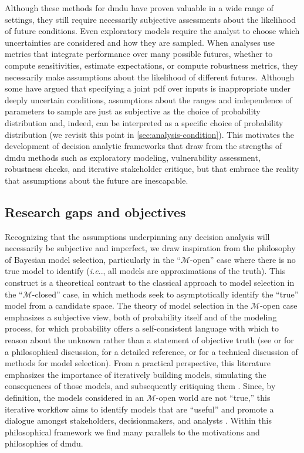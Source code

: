 \documentclass[11pt]{article}
\makeatletter
\newcommand{\klaus}[1]{\todo[color=rosso, textcolor=grigio]{\textbf{ATTN Klaus:~}#1}}
\DeclareRobustCommand\onedot{\futurelet\@let@token\@onedot}
\def\@onedot{\ifx\@let@token.\else.\null\fi\xspace}
\def\ie{\emph{i.e}\onedot} \def\Ie{\emph{I.e}\onedot}
\DeclareRobustCommand\onedot{\futurelet\@let@token\@onedot}
\def\@onedot{\ifx\@let@token.\else.\null\fi\xspace}
\def\ie{\emph{i.e}\onedot} \def\Ie{\emph{I.e}\onedot}
\makeatother
\begin{document}
Although these methods for \gls{dmdu} have proven valuable in a wide range of settings, they still require necessarily subjective assessments about the likelihood of future conditions.
Even exploratory models require the analyst to choose which uncertainties are considered and how they are sampled.
When analyses use metrics that integrate performance over many possible futures, whether to compute sensitivities, estimate expectations, or compute robustness metrics, they necessarily make assumptions about the likelihood of different futures.
Although some have argued\klaus{Can I get away w/o calling out a particular paper here?} that specifying a joint \gls{pdf} over inputs is inappropriate under deeply uncertain conditions, assumptions about the ranges and independence of parameters to sample are just as subjective as the choice of probability distribution \citep{schneider_scenarios:2002,quinn_exploratory:2020} and, indeed, can be interpreted  as a specific choice of probability distribution (we revisit this point in \cref{sec:analysis-condition}).
This motivates the development of decision analytic frameworks that draw from the strengths of \gls{dmdu} methods such as exploratory modeling, vulnerability assessment, robustness checks, and iterative stakeholder critique, but that embrace the reality that assumptions about the future are inescapable.

\subsection{Research gaps and objectives}

Recognizing that the assumptions underpinning any decision analysis will necessarily be subjective and imperfect, we draw inspiration from the philosophy of Bayesian model selection, particularly in the ``$\mathcal{M}$-open'' case where there is no true model to identify (\ie, all models are approximations of the truth).
This construct is a theoretical contrast to the classical approach to model selection in the ``$\mathcal{M}$-closed'' case, in which methods seek to asymptotically identify the ``true'' model from a candidate space.
The theory of model selection in the $\mathcal{M}$-open case emphasizes a subjective view, both of probability itself and of the modeling process, for which probability offers a self-consistent language with which to reason about the unknown rather than a statement of objective truth (see \cite{gelman_philosophy:2013} or \cite{ramsey_probability:2016} for a philosophical discussion, \cite{jaynes_probability:2003} for a detailed reference, or \cite{Piironen:2017eh} for a technical discussion of methods for model selection).
From a practical perspective, this literature emphasizes the importance of iteratively building models, simulating the consequences of those models, and subsequently critiquing them \citep{gelman_workflow:2020}.
Since, by definition, the models considered in an $\mathcal{M}$-open world are not ``true,'' this iterative workflow aims to identify models that are ``useful'' \citep{Box:1976gu} and promote a dialogue amongst stakeholders, decisionmakers, and analysts \citep{gelman_philosophy:2013}.
Within this philosophical framework we find many parallels to the motivations and philosophies of \gls{dmdu}.
\end{document}
